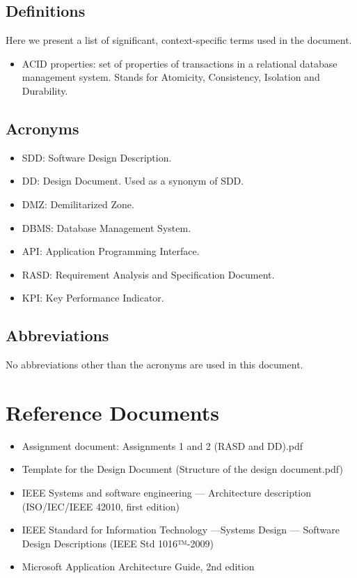 \subsection{Definitions}
Here we present a list of significant, context-specific terms used in the document. 
\begin{itemize}
	\item ACID properties: set of properties of transactions in a relational database management system. Stands for Atomicity, Consistency, Isolation and Durability.
\end{itemize}
\subsection{Acronyms}
\begin{itemize}
	\item SDD: Software Design Description.
	\item DD: Design Document. Used as a synonym of SDD.
	\item DMZ: Demilitarized Zone.
	\item DBMS: Database Management System.
	\item API: Application Programming Interface.
	\item RASD: Requirement Analysis and Specification Document.
	\item KPI: Key Performance Indicator.
\end{itemize}
\subsection{Abbreviations}
No abbreviations other than the acronyms are used in this document.

\section{Reference Documents}
\begin{itemize}
	\item Assignment document: Assignments 1 and 2 (RASD and DD).pdf
	\item Template for the Design Document (Structure of the design document.pdf)
 	\item IEEE Systems and software engineering — Architecture description (ISO/IEC/IEEE 42010, first edition)
 	\item IEEE Standard for Information Technology —Systems Design — Software Design Descriptions (IEEE Std 1016™-2009)
 	\item Microsoft Application Architecture Guide, 2nd edition
\end{itemize} 
 
